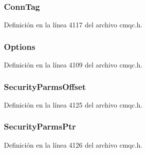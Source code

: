 \subsubsection[{Conn\+Tag}]{ Conn\+Tag}\label{structtag_m_q_c_n_o_a5beb55e47cd784cb266d9744248886b5}


Definición en la línea 4117 del archivo cmqc.\+h.

\hypertarget{structtag_m_q_c_n_o_ad7aff2d6c6044809464380998d24ec5c}{}
\subsubsection[{Options}]{ Options}\label{structtag_m_q_c_n_o_ad7aff2d6c6044809464380998d24ec5c}


Definición en la línea 4109 del archivo cmqc.\+h.

\hypertarget{structtag_m_q_c_n_o_aa27268ebe318b338a6560bc161f973a1}{}
\subsubsection[{Security\+Parms\+Offset}]{ Security\+Parms\+Offset}\label{structtag_m_q_c_n_o_aa27268ebe318b338a6560bc161f973a1}


Definición en la línea 4125 del archivo cmqc.\+h.

\hypertarget{structtag_m_q_c_n_o_a05cf93aa50d81a5d3f54afd5f2e0a35d}{}
\subsubsection[{Security\+Parms\+Ptr}]{ Security\+Parms\+Ptr}\label{structtag_m_q_c_n_o_a05cf93aa50d81a5d3f54afd5f2e0a35d}


Definición en la línea 4126 del archivo cmqc.\+h.

\hypertarget{structtag_m_q_c_n_o_a20bd6e5f8cb1b77946a9cdbd77e3eb03}{}
